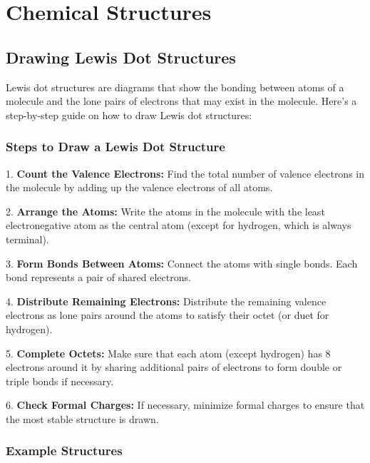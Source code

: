 \documentclass{report}
\begin{document}


\pagebreak

\chapter{Chemical Structures}

\section{Drawing Lewis Dot Structures}

Lewis dot structures are diagrams that show the bonding between atoms of a molecule and the lone pairs of electrons that may exist in the molecule. Here's a step-by-step guide on how to draw Lewis dot structures:

\subsection{Steps to Draw a Lewis Dot Structure}

1. \textbf{Count the Valence Electrons:}
Find the total number of valence electrons in the molecule by adding up the valence electrons of all atoms.

2. \textbf{Arrange the Atoms:}
Write the atoms in the molecule with the least electronegative atom as the central atom (except for hydrogen, which is always terminal).

3. \textbf{Form Bonds Between Atoms:}
Connect the atoms with single bonds. Each bond represents a pair of shared electrons.

4. \textbf{Distribute Remaining Electrons:}
Distribute the remaining valence electrons as lone pairs around the atoms to satisfy their octet (or duet for hydrogen).

5. \textbf{Complete Octets:}
Make sure that each atom (except hydrogen) has 8 electrons around it by sharing additional pairs of electrons to form double or triple bonds if necessary.

6. \textbf{Check Formal Charges:}
If necessary, minimize formal charges to ensure that the most stable structure is drawn.

\subsection{Example Structures}
\end{document}
